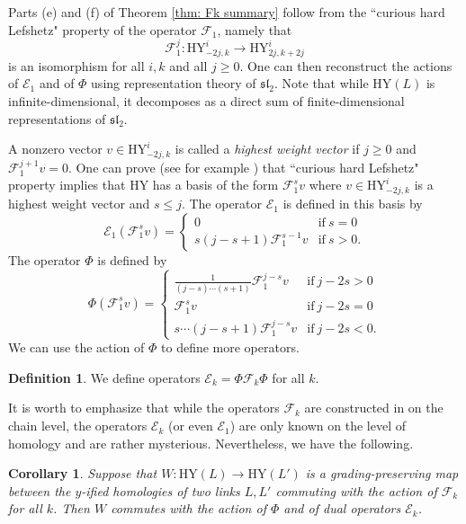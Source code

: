 \documentclass{amsart}
\newcommand{\HY}{\mathrm{HY}}
\newcommand{\CE}{\mathcal{E}}
\newcommand{\CF}{\mathcal{F}}
\numberwithin{equation}{section}
\newtheorem{corollary}[theorem]{Corollary}
\theoremstyle{definition}
\newtheorem{definition}[theorem]{Definition}
\begin{document}
 
Parts (e) and (f) of Theorem \ref{thm: Fk summary} follow from the ``curious hard Lefshetz" property of the operator $\CF_1$, namely that
$$
\CF_1^{j}:\HY^{i}_{-2j,k}\to \HY^{i}_{2j,k+2j}
$$
is an isomorphism for all $i,k$ and all $j\ge 0$. One can then reconstruct the actions of $\CE_1$ and of $\Phi$ using representation theory of $\mathfrak{sl}_2$. Note that while $\HY(L)$ is infinite-dimensional, it decomposes as a direct sum of finite-dimensional representations of $\mathfrak{sl}_2$.


A nonzero vector $v\in \HY^{i}_{-2j,k}$  is called a {\em highest weight vector} if $j\ge 0$ and $\CF_1^{j+1}v=0$. One can prove (see for example \cite[Lemma 7.2]{GHM}) that ``curious hard Lefshetz" property implies that $\HY$ has a basis of the form $\CF_1^sv$ where $v\in \HY^{i}_{-2j,k}$ is a highest weight vector and $s\le j$. The operator $\CE_1$ is defined in this basis by
\begin{equation}
\label{eq: def E1}
\CE_1(\CF_1^sv)=\begin{cases}
0 & \mathrm{if}\ s=0\\
s(j-s+1)\CF_1^{s-1}v & \mathrm{if}\ s>0.
\end{cases}
\end{equation}
The operator $\Phi$ is defined by
\begin{equation}
\label{eq: def Phi}
\Phi(\CF_1^sv)=\begin{cases}
\frac{1}{(j-s)\cdots (s+1)}\CF_1^{j-s}v & \mathrm{if}\ j-2s>0\\
\CF_1^sv & \mathrm{if}\ j-2s=0\\
s\cdots (j-s+1)\CF_1^{j-s}v & \mathrm{if}\ j-2s<0.
\end{cases}
\end{equation}
We can use the action of $\Phi$ to define more operators.
\begin{definition}
\label{def: Ek homology}
We define operators $\CE_k=\Phi \CF_k \Phi$ for all $k$.
\end{definition}

It is worth to emphasize that while the operators $\CF_k$ are constructed in \cite{GHM} on the chain level, the operators $\CE_k$ (or even $\CE_1$) are only known on the level of homology and are rather mysterious.
Nevertheless, we have the following.

\begin{corollary}
\label{cor: hard Lefshetz}
Suppose that $W:\HY(L)\to \HY(L')$ is a grading-preserving map between the $y$-ified homologies of two links $L,L'$ commuting with the action of $\CF_k$ for all $k$. Then $W$ commutes with the action of $\Phi$ and of dual operators $\CE_k$.
\end{corollary}
\end{document}

